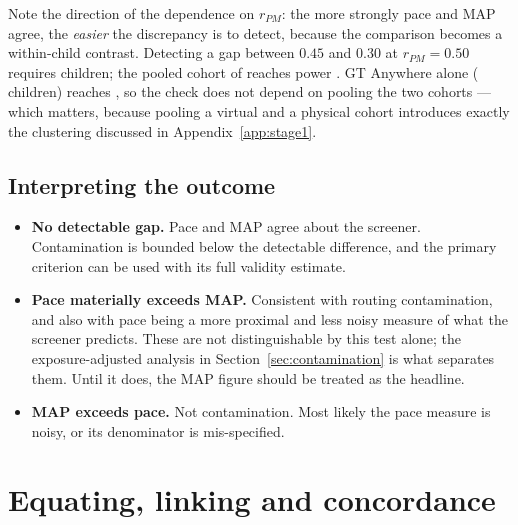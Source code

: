 Note the direction of the dependence on $r_{PM}$: the more strongly pace and MAP
agree, the \emph{easier} the discrepancy is to detect, because the comparison
becomes a within-child contrast. Detecting a gap between $0.45$ and $0.30$ at
$r_{PM}=0.50$ requires \NcontamCheckMid{} children; the pooled cohort of
\Nbothcohorts{} reaches power \PowerBothContam{}. GT Anywhere alone
(\NanywhereCohort{} children) reaches \PowerAnywhereContam{}, so the check does
not depend on pooling the two cohorts --- which matters, because pooling a
virtual and a physical cohort introduces exactly the clustering discussed in
Appendix~\ref{app:stage1}.

\subsection{Interpreting the outcome}

\begin{itemize}[leftmargin=1.4em,itemsep=0.15em]
\item \textbf{No detectable gap.} Pace and MAP agree about the screener.
Contamination is bounded below the detectable difference, and the primary
criterion can be used with its full validity estimate.
\item \textbf{Pace materially exceeds MAP.} Consistent with routing
contamination, and also with pace being a more proximal and less noisy measure
of what the screener predicts. These are not distinguishable by this test alone;
the exposure-adjusted analysis in Section~\ref{sec:contamination} is what
separates them. Until it does, the MAP figure should be treated as the headline.
\item \textbf{MAP exceeds pace.} Not contamination. Most likely the pace measure
is noisy, or its denominator is mis-specified.
\end{itemize}


\section{Equating, linking and concordance}
\label{app:equating}

